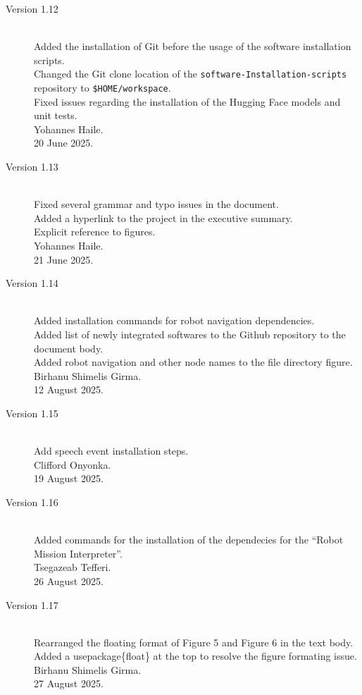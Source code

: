 \documentclass{CSSRforAfrica}
\begin{document}
{\begin{description}
			\item [Version 1.12]~\\
			Added the installation of Git before the usage of the software installation scripts.\\
			Changed the Git clone location of the \texttt{software-Installation-scripts} repository to \texttt{\$HOME/workspace}.\\
			Fixed issues regarding the installation of the Hugging Face models and unit tests.\\
			Yohannes Haile.\\
			20 June 2025.
			
			\item [Version 1.13]~\\
			Fixed several grammar and typo issues in the document.\\
			Added a hyperlink to the project in the executive summary.\\
			Explicit reference to figures.\\
			Yohannes Haile.\\
			21 June 2025.
			
			\item [Version 1.14]~\\
			Added installation commands for robot navigation dependencies.\\
			Added list of newly integrated softwares to the Github repository to the document body.\\
			Added robot navigation and other node names to the file directory figure.\\
			Birhanu Shimelis Girma.\\
			12 August 2025.
			
			\item [Version 1.15]~\\
			Add speech event installation steps.\\
			Clifford Onyonka.\\
			19 August 2025.
			
			\item [Version 1.16]~\\
			Added commands for the installation of the dependecies for the ``Robot Mission Interpreter''.\\
			Tsegazeab Tefferi.\\
			26 August 2025.
			
			\newpage
			
			\item [Version 1.17]~\\
			Rearranged the floating format of Figure 5 and Figure 6 in the text body. \\
			Added a usepackage\{float\} at the top to resolve the figure formating issue.\\
			Birhanu Shimelis Girma.\\
			27 August 2025.
			

\end{description}}
\end{document}

